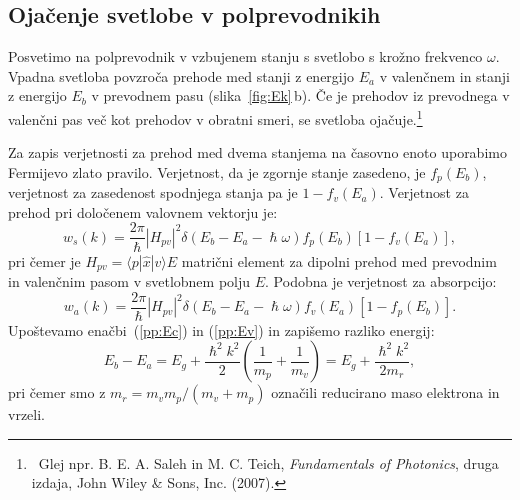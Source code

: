 \subsection*{Ojačenje svetlobe v polprevodnikih}
Posvetimo na polprevodnik v vzbujenem stanju s svetlobo s krožno frekvenco $\omega$.
Vpadna svetloba povzroča prehode med stanji z energijo $E_a$ v valenčnem 
in stanji z energijo $E_b$ v prevodnem pasu (slika~\ref{fig:Ek}\,b).
Če je prehodov iz prevodnega v valenčni pas več kot prehodov v obratni
smeri, se svetloba ojačuje.\footnote{~Glej npr. B. E. A. Saleh in M. C. Teich, 
{\it Fundamentals of Photonics}, druga izdaja, John Wiley \& Sons, Inc. (2007).}

Za zapis verjetnosti za prehod med dvema stanjema na časovno
enoto uporabimo Fermijevo zlato pravilo. Verjetnost, da je zgornje stanje zasedeno, je 
$f_p(E_b)$, verjetnost za zasedenost spodnjega stanja pa je $1-f_v(E_a)$. Verjetnost 
za prehod pri določenem valovnem vektorju je:
\begin{equation}  
w_s(k)=\frac{2\pi}{\hslash}|H_{pv}|^2\delta(E_b-E_a- \hslash\omega)
f_p(E_b)[1-f_v(E_a)],
\label{6.5}
\end{equation}
pri čemer je $H_{pv}= \langle p| \hat{x}|v\rangle E $ matrični element za dipolni
prehod  med prevodnim in valenčnim pasom v svetlobnem polju $E$. Podobna je
verjetnost za absorpcijo:
\begin{equation}  
w_a(k)=\frac{2\pi}{\hslash}|H_{pv}|^2\delta(E_b-E_a- \hslash\omega)
f_v(E_a)[1-f_p(E_b)].
\label{6.6}
\end{equation}
Upoštevamo enačbi~(\ref{pp:Ec}) in (\ref{pp:Ev}) in zapišemo razliko energij:
\begin{equation}  
E_b-E_a= E_g + \frac{\hslash^2 k^2}{2}(\frac{1}{m_p}+ \frac{1}{m_v})= E_g + \frac{\hslash^2 k^2}{2m_r},
\label{6.8}
\end{equation}
pri čemer smo z $m_r=m_v m_p/(m_v+m_p)$ označili reducirano maso elektrona in vrzeli.

